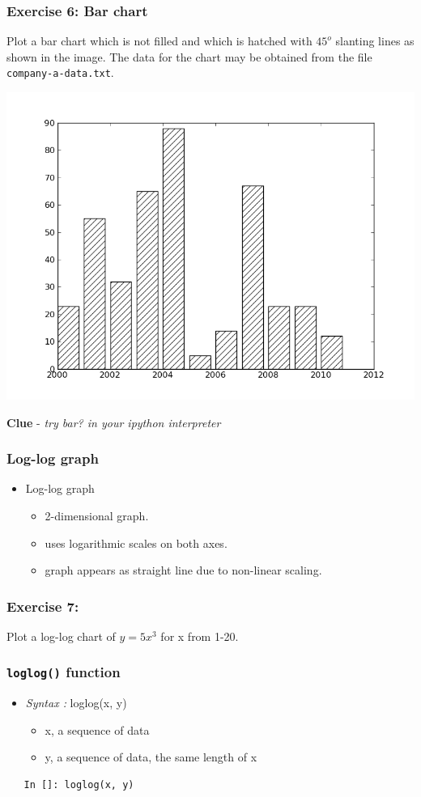 \documentclass[presentation]{beamer}
\begin{document}
\begin{frame}
\frametitle{Exercise 6: Bar chart}
\label{sec-14}

  Plot a bar chart which is not filled and which is hatched with 
    $45^o$
  slanting lines as shown in the image. The data for the chart may be
  obtained from the file \verb~company-a-data.txt~.
   \begin{center}
      \includegraphics[scale=0.3]{bar-chart-hatch}    
    \end{center}
  \textbf{Clue} - \emph{try bar? in your ipython interpreter}
\end{frame}
\begin{frame}
\frametitle{Log-log graph}
\label{sec-15}


\begin{itemize}
\item Log-log graph
\begin{itemize}
\item 2-dimensional graph.
\item uses logarithmic scales on both axes.
\item graph appears as straight line due to non-linear scaling.
\end{itemize}
\end{itemize}
\end{frame}
\begin{frame}
\frametitle{Exercise 7:}
\label{sec-16}

  Plot a log-log chart of 
    $y = 5x^3$
  for x from 1-20.
\end{frame}
\begin{frame}[fragile]
\frametitle{\verb~loglog()~ function}
\label{sec-17}


\begin{itemize}
\item \emph{Syntax :} loglog(x, y)
\begin{itemize}
\item x, a sequence of data
\item y, a sequence of data, the same length of x
\end{itemize}
\end{itemize}
\begin{verbatim}
   In []: loglog(x, y)
\end{verbatim}
\end{frame}
\end{document}
